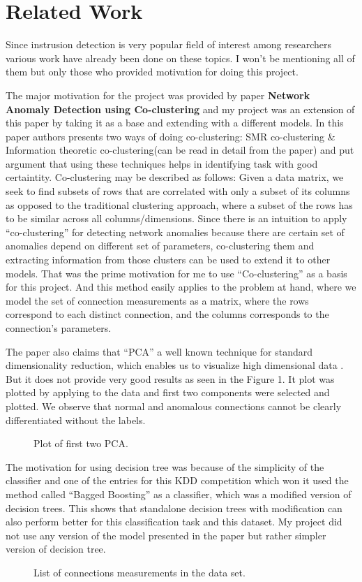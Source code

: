\documentclass{acm_proc_article-sp}
\begin{document}
\section{Related Work}
Since instrusion detection is very popular field of interest among researchers various work have already been done on these topics. I won't be mentioning all of them but only those who provided motivation for doing this project.

The major motivation for the project was provided by paper \textbf{Network Anomaly Detection using Co-clustering} and my project was an extension of this paper by taking it as a base and extending with a different models. In this paper authors presents two ways of doing co-clustering: SMR co-clustering \& Information theoretic co-clustering(can be read in detail from the paper) and put argument that using these techniques helps in identifying task with good certaintity. Co-clustering may be described as follows: Given a data matrix, we seek to find subsets of rows that are correlated with only a subset of its columns as opposed to the traditional clustering approach, where a subset of the rows has to be similar across all columns/dimensions. Since there is an intuition to apply ``co-clustering'' for detecting network anomalies because there are certain set of anomalies depend on different set of parameters, co-clustering them and extracting information from those clusters can be used to extend it to other models. That was the prime motivation for me to use ``Co-clustering'' as a basis for this project. And this method easily applies to the problem at hand, where we model the set of connection measurements as a matrix, where the rows correspond to each distinct connection, and the columns corresponds to the connection's parameters. \cite{papal} 

The paper also claims that ``PCA'' a well known technique for standard dimensionality reduction, which enables us to visualize high dimensional data \cite{pca}. But it does not provide very good results as seen in the Figure 1. It plot was plotted by applying to the data and first two components were selected and plotted. We observe that normal and anomalous connections cannot be clearly differentiated without the labels. 

\begin{figure}
\centering
{}
\caption{Plot of first two PCA.}
\end{figure}

The motivation for using decision tree was because of the simplicity of the classifier and one of the entries for this KDD competition which won it used the method called ``Bagged Boosting'' as a classifier, which was a modified version of decision trees\cite{bbt}. This shows that standalone decision trees with modification can also perform better for this classification task and this dataset. My project did not use any version of the model presented in the paper but rather simpler version of decision tree.
\begin{figure}[h]
	\centering
	\caption{List of connections measurements in the data set.}
\end{figure}
\end{document}

